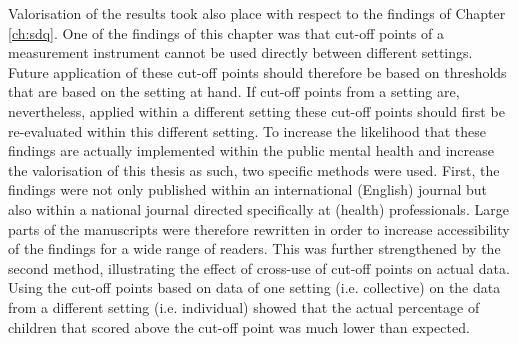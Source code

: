Valorisation of the results took also place with respect to the findings of Chapter \ref{ch:sdq}. 
One of the findings of this chapter was that cut-off points of a measurement instrument cannot be used directly between different settings. 
Future application of these cut-off points should therefore be based on thresholds that are based on the setting at hand. 
If cut-off points from a setting are, nevertheless, applied within a different setting these cut-off points should first be re-evaluated within this different setting. 
To increase the likelihood that these findings are actually implemented within the public mental health and increase the valorisation of this thesis as such, two specific methods were used. 
First, the findings were not only published within an international (English) journal but also within a national journal directed specifically at (health) professionals. 
Large parts of the manuscripts were therefore rewritten in order to increase accessibility of the findings for a wide range of readers. 
This was further strengthened by the second method, illustrating the effect of cross-use of cut-off points on actual data. 
Using the cut-off points based on data of one setting (i.e. collective) on the data from a different setting (i.e. individual) showed that the actual percentage of children that scored above the cut-off point was much lower than expected.      

